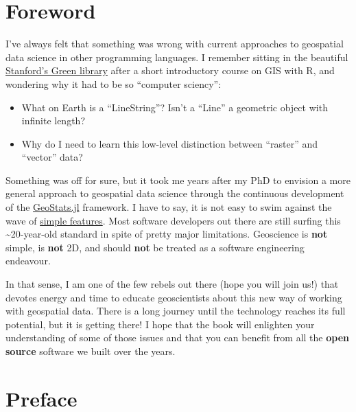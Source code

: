 \documentclass[
  letterpaper,
  DIV=11,
  numbers=noendperiod]{scrreprt}
\providecommand{\tightlist}{%
  \setlength{\itemsep}{0pt}\setlength{\parskip}{0pt}}\usepackage{longtable,booktabs,array}
\begin{document}

\hypertarget{foreword}{%
\chapter*{Foreword}\label{foreword}}


I've always felt that something was wrong with current approaches to
geospatial data science in other programming languages. I remember
sitting in the beautiful
\href{https://en.wikipedia.org/wiki/Cecil_H._Green_Library}{Stanford's
Green library} after a short introductory course on GIS with R, and
wondering why it had to be so ``computer sciency'':

\begin{itemize}
\tightlist
\item
  What on Earth is a ``LineString''? Isn't a ``Line'' a geometric object
  with infinite length?
\item
  Why do I need to learn this low-level distinction between ``raster''
  and ``vector'' data?
\end{itemize}

Something was off for sure, but it took me years after my PhD to
envision a more general approach to geospatial data science through the
continuous development of the
\href{https://github.com/JuliaEarth/GeoStats.jl}{GeoStats.jl} framework.
I have to say, it is not easy to swim against the wave of
\href{https://www.iso.org/standard/40114.html}{simple features}. Most
software developers out there are still surfing this
\textasciitilde20-year-old standard in spite of pretty major
limitations. Geoscience is \textbf{not} simple, is \textbf{not} 2D, and
should \textbf{not} be treated as a software engineering endeavour.

In that sense, I am one of the few rebels out there (hope you will join
us!) that devotes energy and time to educate geoscientists about this
new way of working with geospatial data. There is a long journey until
the technology reaches its full potential, but it is getting there! I
hope that the book will enlighten your understanding of some of those
issues and that you can benefit from all the \textbf{open source}
software we built over the years.


\hypertarget{preface}{%
\chapter*{Preface}\label{preface}}
\end{document}
